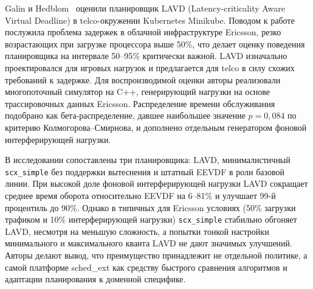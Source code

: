 \documentclass[14pt, oneside]{extbook}
\begin{document}
        Galin и Hedblom~\cite{lavd} оценили планировщик LAVD
        (Latency-criticality Aware Virtual Deadline) в telco-окружении
        Kubernetes Minikube. Поводом к работе послужила проблема
        задержек в облачной инфраструктуре Ericsson, резко
        возрастающих при загрузке процессора выше 50\%, что делает
        оценку поведения планировщика на интервале 50--95\%
        критически важной. LAVD изначально
        проектировался для игровых нагрузок и предлагается для telco
        в силу схожих требований к задержке. Для воспроизводимой
        оценки авторы реализовали многопоточный симулятор на C++,
        генерирующий нагрузки на основе трассировочных данных
        Ericsson. Распределение времени обслуживания подобрано
        как бета-распределение, давшее наибольшее значение
        $p = 0{,}084$ по критерию Колмогорова--Смирнова, и
        дополнено отдельным генератором фоновой интерферирующей
        нагрузки.

        В исследовании сопоставлены три планировщика: LAVD,
        минималистичный \texttt{scx\_simple} без поддержки вытеснения
        и штатный EEVDF в роли базовой линии. При высокой доле фоновой
        интерферирующей нагрузки LAVD сокращает среднее время оборота
        относительно EEVDF на 6--81\% и улучшает 99-й процентиль
        до 90\%. Однако в типичных для Ericsson условиях
        (50\% загрузки трафиком и 10\% интерферирующей нагрузки)
        \texttt{scx\_simple} стабильно обгоняет LAVD, несмотря на
        меньшую сложность, а попытки тонкой настройки
        минимального и максимального кванта LAVD не дают значимых
        улучшений. Авторы делают вывод, что преимущество принадлежит
        не отдельной политике, а самой платформе sched\_ext как
        средству быстрого сравнения алгоритмов и адаптации
        планирования к доменной специфике.
\end{document}
